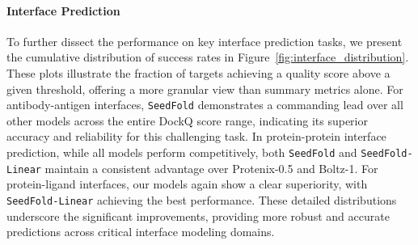 \paragraph{Interface Prediction}
To further dissect the performance on key interface prediction tasks, we present the cumulative distribution of success rates in Figure~\ref{fig:interface_distribution}. These plots illustrate the fraction of targets achieving a quality score above a given threshold, offering a more granular view than summary metrics alone. For antibody-antigen interfaces, \texttt{SeedFold} demonstrates a commanding lead over all other models across the entire DockQ score range, indicating its superior accuracy and reliability for this challenging task. In protein-protein interface prediction, while all models perform competitively, both \texttt{SeedFold} and \texttt{SeedFold-Linear} maintain a consistent advantage over Protenix-0.5 and Boltz-1. For protein-ligand interfaces, our models again show a clear superiority, with \texttt{SeedFold-Linear} achieving the best performance. These detailed distributions underscore the significant improvements, providing more robust and accurate predictions across critical interface modeling domains.







